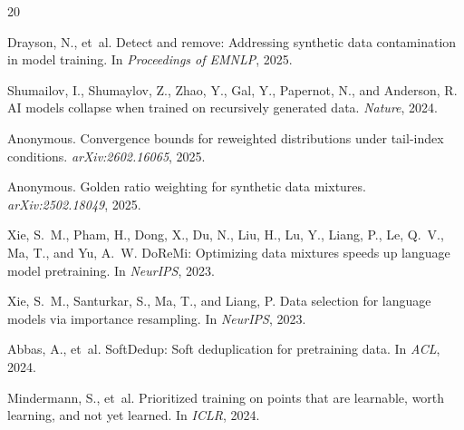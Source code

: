 \documentclass[11pt]{article}
\begin{document}
\begin{thebibliography}{20}

Drayson, N., et~al.
\newblock Detect and remove: Addressing synthetic data contamination in model training.
\newblock In \emph{Proceedings of EMNLP}, 2025.

Shumailov, I., Shumaylov, Z., Zhao, Y., Gal, Y., Papernot, N., and Anderson, R.
\newblock AI models collapse when trained on recursively generated data.
\newblock \emph{Nature}, 2024.

Anonymous.
\newblock Convergence bounds for reweighted distributions under tail-index conditions.
\newblock \emph{arXiv:2602.16065}, 2025.

Anonymous.
\newblock Golden ratio weighting for synthetic data mixtures.
\newblock \emph{arXiv:2502.18049}, 2025.

Xie, S.~M., Pham, H., Dong, X., Du, N., Liu, H., Lu, Y., Liang, P., Le, Q.~V., Ma, T., and Yu, A.~W.
\newblock DoReMi: Optimizing data mixtures speeds up language model pretraining.
\newblock In \emph{NeurIPS}, 2023.

Xie, S.~M., Santurkar, S., Ma, T., and Liang, P.
\newblock Data selection for language models via importance resampling.
\newblock In \emph{NeurIPS}, 2023.

Abbas, A., et~al.
\newblock SoftDedup: Soft deduplication for pretraining data.
\newblock In \emph{ACL}, 2024.

Mindermann, S., et~al.
\newblock Prioritized training on points that are learnable, worth learning, and not yet learned.
\newblock In \emph{ICLR}, 2024.

\end{thebibliography}
\end{document}
